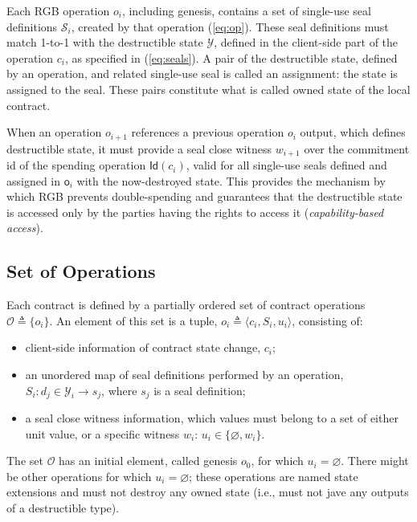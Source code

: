 \documentclass[9pt,oneside]{amsart}
\begin{document}
\begin{multicols}{2}
Each RGB operation $o_i$, including genesis,
contains a set of single-use seal definitions $\mathcal{S}_i$,
created by that operation (\ref{eq:op}).
These seal definitions must match 1-to-1 with the destructible state $\mathcal{Y}$,
defined in the client-side part of the operation $c_i$, as specified in (\ref{eq:seals}).
A pair of the destructible state, defined by an operation, and related single-use seal
is called an \gls{assignment}: the state is assigned to the seal.
These pairs constitute what is called \gls{owned state} of the \gls{local contract}.

When an operation $o_{i+1}$ references a previous operation $o_i$ output,
which defines destructible state, it must provide a \gls{seal close witness} $w_{i+1}$
over the commitment id of the spending operation $\mathsf{Id}(c_i)$,
valid for all single-use seals defined and assigned in $\mathsf{o}_i$
with the now-destroyed state.
This provides the mechanism by which RGB prevents double-spending
and guarantees that the destructible state is accessed only by the parties
having the rights to access it (\emph{capability-based access}).

\subsection{Set of Operations}

Each contract is defined by a partially ordered set of contract operations
$\mathcal{O} \triangleq \{ o_i \}$.
An element of this set is a tuple, $o_i \triangleq \langle c_i, S_i, u_i \rangle$, consisting of:
\begin{itemize}
\item client-side information of contract state change, $c_i$;
\item an unordered map of seal definitions performed by an operation, 
  $S_i: d_j \in \mathcal{Y}_i \rightarrow s_j$, where $s_j$ is a seal definition;
\item a \gls{seal close witness} information, 
  which values must belong to a set of either unit value, or a specific witness $w_i$: 
  $u_i \in \{ \varnothing, w_i \}$.
\end{itemize}

The set $\mathcal{O}$ has an initial element, called \gls{genesis} $o_0$, for which $u_i = \varnothing$.
There might be other operations for which $u_i = \varnothing$;
these operations are named \glspl{state extension} and must not destroy any owned state
(i.e., must not jave any outputs of a destructible type).


\end{multicols}
\end{document}

